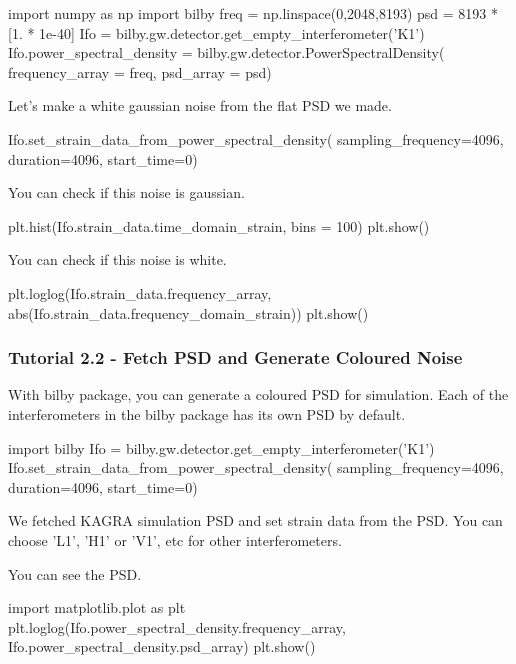 \begin{python}[python3]
    import numpy as np
    import bilby
    freq = np.linspace(0,2048,8193)
    psd = 8193 * [1. * 1e-40]
    Ifo = bilby.gw.detector.get_empty_interferometer('K1')
    Ifo.power_spectral_density = bilby.gw.detector.PowerSpectralDensity(
        frequency_array = freq,
        psd_array = psd)
\end{python}

Let's make a white gaussian noise from the flat PSD we made.

\begin{python}[python3]
    Ifo.set_strain_data_from_power_spectral_density(
        sampling_frequency=4096,
        duration=4096,
        start_time=0)
\end{python}

You can check if this noise is gaussian.

\begin{python}[python3]
    plt.hist(Ifo.strain_data.time_domain_strain, bins = 100)
    plt.show()
\end{python}

You can check if this noise is white.

\begin{python}[python3]
    plt.loglog(Ifo.strain_data.frequency_array, abs(Ifo.strain_data.frequency_domain_strain))
    plt.show()
\end{python}

\subsubsection{Tutorial 2.2 - Fetch PSD and Generate Coloured Noise}

With bilby package, you can generate a coloured PSD for simulation. Each of the interferometers in the bilby package has its own PSD by default.

\begin{python}[python3]
    import bilby
    Ifo = bilby.gw.detector.get_empty_interferometer('K1')
    Ifo.set_strain_data_from_power_spectral_density(
        sampling_frequency=4096,
        duration=4096,
        start_time=0)
\end{python}

We fetched KAGRA simulation PSD and set strain data from the PSD. You can choose 'L1', 'H1' or 'V1', etc for other interferometers.

You can see the PSD.

\begin{python}[python3]
    import matplotlib.plot as plt
    plt.loglog(Ifo.power_spectral_density.frequency_array, Ifo.power_spectral_density.psd_array)
    plt.show()
\end{python}

